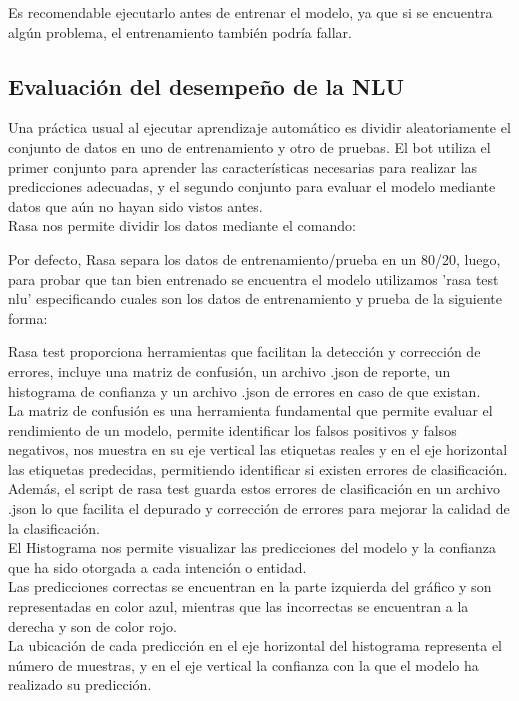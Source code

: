 \begin{center}
\end{center}

Es recomendable ejecutarlo antes de entrenar el modelo, ya que si se encuentra algún problema, el
entrenamiento también podría fallar.

\subsection{Evaluación del desempeño de la NLU}
Una práctica usual al ejecutar aprendizaje automático es dividir aleatoriamente el conjunto de
datos en uno de entrenamiento y otro de pruebas. El bot utiliza el primer conjunto para aprender
las características necesarias para realizar las predicciones adecuadas, y el segundo conjunto para
evaluar el modelo mediante datos que aún no hayan sido vistos antes.\\
Rasa nos permite dividir los datos mediante el comando:

\begin{center}
\end{center}

Por defecto, Rasa separa los datos de entrenamiento/prueba en un 80/20, luego, para probar que tan
bien entrenado se encuentra el modelo utilizamos 'rasa test nlu' especificando cuales son los datos
de entrenamiento y prueba de la siguiente forma:\\

\begin{center}
\end{center}

Rasa test proporciona herramientas que facilitan la detección y corrección de errores, incluye una
matriz de confusión, un archivo .json de reporte, un histograma de confianza y un archivo .json de
errores en caso de que existan.\\
La matriz de confusión es una herramienta fundamental que permite evaluar el rendimiento de un
modelo, permite identificar los falsos positivos y falsos negativos, nos muestra en su eje vertical
las etiquetas reales y en el eje horizontal las etiquetas predecidas, permitiendo identificar si
existen errores de clasificación.\\
Además, el script de rasa test guarda estos errores de clasificación en un archivo .json lo que
facilita el depurado y corrección de errores para mejorar la calidad de la clasificación.\\
El Histograma nos permite visualizar las predicciones del modelo y la confianza que ha sido
otorgada a cada intención o entidad.\\
Las predicciones correctas se encuentran en la parte izquierda del gráfico y son representadas en
color azul, mientras que las incorrectas se encuentran a la derecha y son de color rojo.\\
La ubicación de cada predicción en el eje horizontal del histograma representa el número de
muestras, y en el eje vertical la confianza con la que el modelo ha realizado su
predicción. \cite{interpretacion_graficos}

